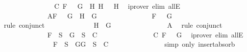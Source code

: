 \begin{isabellebody}
\ \ \ \ \ \ \ \ \ \ \ \ \ \ \isamarkupfalse%
\ C{}\ {\isacartoucheopen}F\ {\isacharequal}\ \isactrlbold {\isasymnot}\ {\isacharparenleft}G\ \isactrlbold {\isasymrightarrow}\ H{}{\isacharparenright}{\isacartoucheclose}\ {\isacartoucheopen}H\ {\isacharequal}\ \isactrlbold {\isasymnot}\ H{}{\isacartoucheclose}\ \isamarkupfalse%
\ {\isacharparenleft}iprover\ elim{\isacharcolon}\ allE{\isacharparenright}\isanewline
\ \ \ \ \ \ \ \ \ \ \isamarkupfalse%
\isanewline
\ \ \ \ \ \ \ \ \ \ \ \ \isamarkupfalse%
\ A{}{\isacharcolon}{\isachardoublequoteopen}F\ {\isacharequal}\ \isactrlbold {\isasymnot}{\isacharparenleft}\isactrlbold {\isasymnot}\ G{\isacharparenright}\ {\isasymand}\ H\ {\isacharequal}\ G{\isachardoublequoteclose}\isanewline
\ \ \ \ \ \ \ \ \ \ \ \ \isamarkupfalse%
\ \isamarkupfalse%
\ {\isachardoublequoteopen}F\ {\isacharequal}\ \isactrlbold {\isasymnot}{\isacharparenleft}\isactrlbold {\isasymnot}\ G{\isacharparenright}{\isachardoublequoteclose}\isanewline
\ \ \ \ \ \ \ \ \ \ \ \ \ \ \isamarkupfalse%
\ {\isacharparenleft}rule\ conjunct{}{\isacharparenright}\isanewline
\ \ \ \ \ \ \ \ \ \ \ \ \isamarkupfalse%
\ {\isachardoublequoteopen}H\ {\isacharequal}\ G{\isachardoublequoteclose}\isanewline
\ \ \ \ \ \ \ \ \ \ \ \ \ \ \isamarkupfalse%
\ A{}\ \isamarkupfalse%
\ {\isacharparenleft}rule\ conjunct{}{\isacharparenright}\isanewline
\ \ \ \ \ \ \ \ \ \ \ \ \isamarkupfalse%
\ {\isachardoublequoteopen}F\ {\isasymin}\ S\ {\isasymlongrightarrow}\ {\isacharbraceleft}G{\isacharbraceright}\ {\isasymunion}\ S\ {\isasymin}\ C{\isachardoublequoteclose}\isanewline
\ \ \ \ \ \ \ \ \ \ \ \ \ \ \isamarkupfalse%
\ C{}\ {\isacartoucheopen}F\ {\isacharequal}\ \isactrlbold {\isasymnot}{\isacharparenleft}\isactrlbold {\isasymnot}\ G{\isacharparenright}{\isacartoucheclose}\ \isamarkupfalse%
\ {\isacharparenleft}iprover\ elim{\isacharcolon}\ allE{\isacharparenright}\isanewline
\ \ \ \ \ \ \ \ \ \ \ \ \isamarkupfalse%
\ \isamarkupfalse%
\ {\isachardoublequoteopen}F\ {\isasymin}\ S\ {\isasymlongrightarrow}\ {\isacharbraceleft}G{\isacharcomma}G{\isacharbraceright}\ {\isasymunion}\ S\ {\isasymin}\ C{\isachardoublequoteclose}\isanewline
\ \ \ \ \ \ \ \ \ \ \ \ \ \ \isamarkupfalse%
\ {\isacharparenleft}simp\ only{\isacharcolon}\ insert{\isacharunderscore}absorb{}{\isacharparenright}\isanewline

\end{isabellebody}
